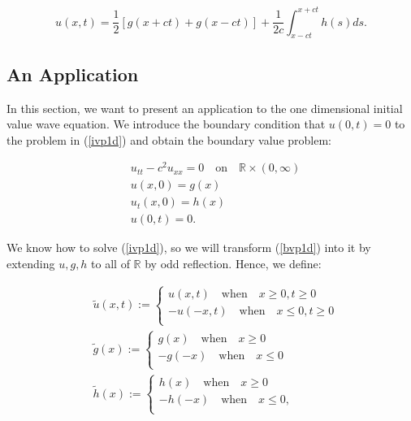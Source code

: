 \documentclass[a4paper, 12pt]{article}
\numberwithin{equation}{section}
\begin{document}
\begin{equation} \label{DAla}
    u(x,t)=\frac{1}{2}\left[g(x+ct)+g(x-ct)\right]+\frac{1}{2c}\int^{x+ct}_{x-ct}h(s)ds.
\end{equation}

\subsection{An Application} \label{anapplication}
In this section, we want to present an application to the one dimensional initial value wave equation. We introduce the boundary condition that
$u(0,t)=0$ to the problem in (\ref{ivp1d}) and obtain the boundary value problem:

\begin{equation} \label{bvp1d}
    \begin{aligned}
    &u_{tt}-c^2u_{xx}=0 \quad \textrm {on} \quad \mathbb{R} \times (0,\infty)\\
    &u(x,0)=g(x)\\
    &u_t(x,0)=h(x)\\
    &u(0,t)=0.
    \end{aligned}
\end{equation}

We know how to solve (\ref{ivp1d}), so we will transform (\ref{bvp1d}) into it by extending $u,g,h$ to all of $\mathbb{R}$ by odd reflection. \cite{Ev}
Hence, we define:

\begin{equation*}
    \begin{aligned}
        &\tilde{u}(x,t):=
        \begin{cases}
            u(x,t) \quad \textrm{when} \quad x \ge 0, t \ge 0\\
            -u(-x,t) \quad \textrm{when} \quad x \le 0, t \ge 0\\
        \end{cases}
        \\
        &\tilde{g}(x):=
        \begin{cases}
            g(x) \quad \textrm{when} \quad x \ge 0\\
            -g(-x) \quad \textrm{when} \quad x \le 0\\
        \end{cases}
        \\
        &\tilde{h}(x):=
        \begin{cases}
            h(x) \quad \textrm{when} \quad x \ge 0\\
            -h(-x) \quad \textrm{when} \quad x \le 0,\\
        \end{cases}
    \end{aligned}
\end{equation*}
\end{document}
